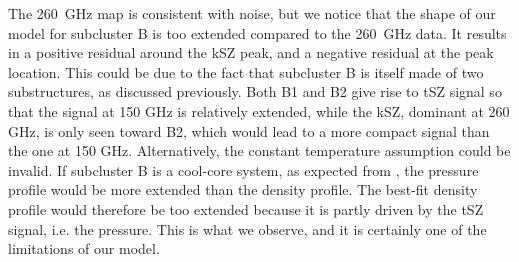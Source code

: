 \documentclass[twocolumn,traditabstract]{aa}
\begin{document}
The 260~GHz map is consistent with noise, but we notice that the shape of our model for subcluster B is too extended compared to the 260~GHz data. It results in a positive residual around the kSZ peak, and a negative residual at the peak location. This could be due to the fact that subcluster B is itself made of two substructures, as discussed previously. Both B1 and B2 give rise to tSZ signal so that the signal at 150 GHz is relatively extended, while the kSZ, dominant at 260 GHz, is only seen toward B2, which would lead to a more compact signal than the one at 150 GHz. Alternatively, the constant temperature assumption could be invalid. If subcluster B is a cool-core system, as expected from \cite{Ma2009}, the pressure profile would be more extended than the density profile. The best-fit density profile would therefore be too extended because it is partly driven by the tSZ signal, i.e. the pressure. This is what we observe, and it is certainly one of the limitations of our model.
\end{document}
